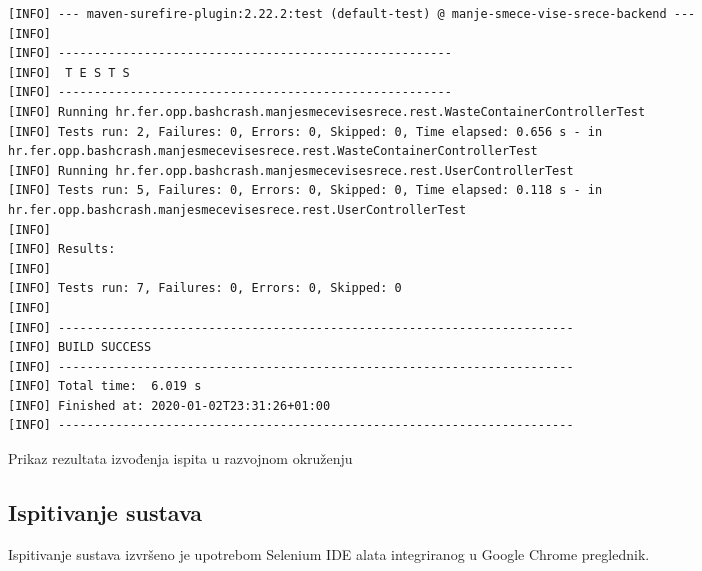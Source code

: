 \begin{listing}[H]
	\begin{verbatim}
[INFO] --- maven-surefire-plugin:2.22.2:test (default-test) @ manje-smece-vise-srece-backend ---
[INFO] 
[INFO] -------------------------------------------------------
[INFO]  T E S T S
[INFO] -------------------------------------------------------
[INFO] Running hr.fer.opp.bashcrash.manjesmecevisesrece.rest.WasteContainerControllerTest
[INFO] Tests run: 2, Failures: 0, Errors: 0, Skipped: 0, Time elapsed: 0.656 s - in hr.fer.opp.bashcrash.manjesmecevisesrece.rest.WasteContainerControllerTest
[INFO] Running hr.fer.opp.bashcrash.manjesmecevisesrece.rest.UserControllerTest
[INFO] Tests run: 5, Failures: 0, Errors: 0, Skipped: 0, Time elapsed: 0.118 s - in hr.fer.opp.bashcrash.manjesmecevisesrece.rest.UserControllerTest
[INFO] 
[INFO] Results:
[INFO] 
[INFO] Tests run: 7, Failures: 0, Errors: 0, Skipped: 0
[INFO] 
[INFO] ------------------------------------------------------------------------
[INFO] BUILD SUCCESS
[INFO] ------------------------------------------------------------------------
[INFO] Total time:  6.019 s
[INFO] Finished at: 2020-01-02T23:31:26+01:00
[INFO] ------------------------------------------------------------------------
	\end{verbatim}
	\caption{Prikaz rezultata izvođenja ispita u razvojnom okruženju}
\end{listing}
			\clearpage

			\subsection{Ispitivanje sustava}
			
		 \indent Ispitivanje sustava izvršeno je upotrebom Selenium IDE alata integriranog u Google Chrome preglednik. 
		 \newline
			
